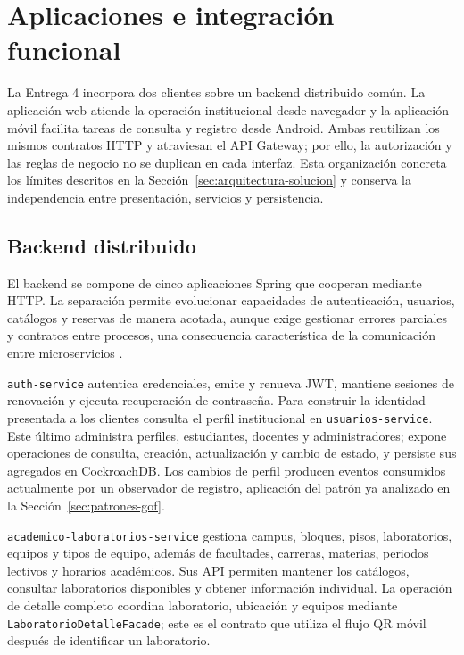 \section{Aplicaciones e integración funcional}
\label{sec:aplicaciones}

La Entrega 4 incorpora dos clientes sobre un backend distribuido común. La
aplicación web atiende la operación institucional desde navegador y la aplicación
móvil facilita tareas de consulta y registro desde Android. Ambas reutilizan los
mismos contratos HTTP y atraviesan el API Gateway; por ello, la autorización y
las reglas de negocio no se duplican en cada interfaz. Esta organización concreta
los límites descritos en la Sección~\ref{sec:arquitectura-solucion} y conserva la
independencia entre presentación, servicios y persistencia.

\subsection{Backend distribuido}
\label{subsec:backend-funcional}

El backend se compone de cinco aplicaciones Spring que cooperan mediante HTTP.
La separación permite evolucionar capacidades de autenticación, usuarios,
catálogos y reservas de manera acotada, aunque exige gestionar errores parciales
y contratos entre procesos, una consecuencia característica de la comunicación
entre microservicios \cite{aksakalli2021deployment}.

\texttt{auth-service} autentica credenciales, emite y renueva JWT, mantiene
sesiones de renovación y ejecuta recuperación de contraseña. Para construir la
identidad presentada a los clientes consulta el perfil institucional en
\texttt{usuarios-service}. Este último administra perfiles, estudiantes,
docentes y administradores; expone operaciones de consulta, creación,
actualización y cambio de estado, y persiste sus agregados en CockroachDB. Los
cambios de perfil producen eventos consumidos actualmente por un observador de
registro, aplicación del patrón ya analizado en la
Sección~\ref{sec:patrones-gof}.

\texttt{academico-laboratorios-service} gestiona campus, bloques, pisos,
laboratorios, equipos y tipos de equipo, además de facultades, carreras,
materias, periodos lectivos y horarios académicos. Sus API permiten mantener los
catálogos, consultar laboratorios disponibles y obtener información individual.
La operación de detalle completo coordina laboratorio, ubicación y equipos
mediante \texttt{LaboratorioDetalleFacade}; este es el contrato que utiliza el
flujo QR móvil después de identificar un laboratorio.

